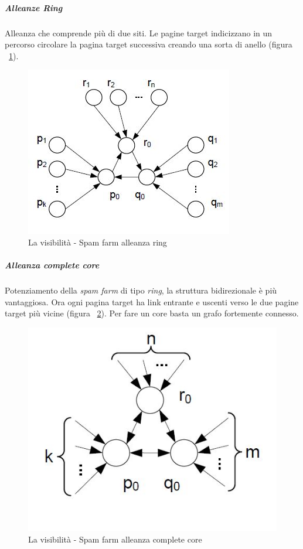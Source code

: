 					\subparagraph{Alleanze Ring}
						Alleanza che comprende più di due siti. Le pagine target indicizzano in un percorso circolare la pagina target successiva creando una sorta di anello (figura ~\ref{fig:LaVisibilita-SpamFarm4}).
						
				\begin{figure} [h]
					\centering
					\includegraphics[scale=1]{images/LaVisibilita-SpamFarm4}
					\caption{La visibilità - Spam farm alleanza ring}
					\label{fig:LaVisibilita-SpamFarm4}
				\end{figure}
				
					\subparagraph{Alleanza complete core}
						Potenziamento della \emph{spam farm} di tipo \emph{ring}, la struttura bidirezionale è più vantaggiosa. Ora ogni pagina target ha link entrante e uscenti verso le due pagine target più vicine (figura ~\ref{fig:LaVisibilita-SpamFarm5}). Per fare un core basta un grafo fortemente connesso.
				
				\begin{figure} [h]
					\centering
					\includegraphics[scale=0.6]{images/LaVisibilita-SpamFarm5}
					\caption{La visibilità - Spam farm alleanza complete core}
					\label{fig:LaVisibilita-SpamFarm5}
				\end{figure}
				
